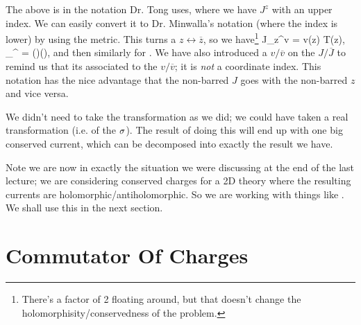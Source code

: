\br 
    The above is in the notation Dr. Tong uses, where we have $J^z$ with an upper index. We can easily convert it to Dr. Minwalla's notation (where the index is lower) by using the metric. This turns a $z \leftrightarrow \overline{z}$, so we have\footnote{There's a factor of 2 floating around, but that doesn't change the holomorphisity/conservedness of the problem.}
    \bse 
        J_z^v = v(z) T(z), \qquad {} \qquad {}_{}^{} = ()(),
    \ese 
    and then similarly for . We have also introduced a $v/\overline{v}$ on the $J/\overline{J}$ to remind us that its associated to the $v/\overline{v}$; it is \textit{not} a coordinate index. This notation has the nice advantage that the non-barred $J$ goes with the non-barred $z$ and vice versa. 
\er 

\br 
    We didn't need to take the transformation as we did; we could have taken a real transformation (i.e. of the $\sigma$). The result of doing this will end up with one big conserved current, which can be decomposed into exactly the result we have.
\er 

\br 
\label{rem:ConformalResidue}
    Note we are now in exactly the situation we were discussing at the end of the last lecture; we are considering conserved charges for a 2D theory where the resulting currents are holomorphic/antiholomorphic. So we are working with things like . We shall use this in the next section.
\er 

\section{Commutator Of Charges}
\label{sec:CommutatorOfCharges}

